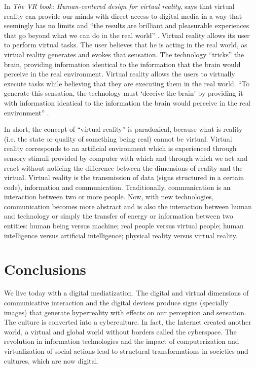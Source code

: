 \documentclass[english]{textolivre}
\begin{document}
In \textit{The VR book: Human-centered design for virtual reality}, \textcite{jerald_vr_2016} says that virtual reality can provide our minds with direct access to digital media in a way that seemingly has no limits and “the results are brilliant and pleasurable experiences that go beyond what we can do in the real world” \cite[p.~1]{jerald_vr_2016}. Virtual reality allows its user to perform virtual tasks. The user believes that he is acting in the real world, as virtual reality generates and evokes that sensation. The technology “tricks” the brain, providing information identical to the information that the brain would perceive in the real environment. Virtual reality allows the users to virtually execute tasks while believing that they are executing them in the real world. “To generate this sensation, the technology must ‘deceive the brain’ by providing it with information identical to the information the brain would perceive in the real environment” \cite[p.~xxii]{arnaldi_virtual_2018}.

In short, the concept of “virtual reality” is paradoxical, because what is reality (i.e. the state or quality of something being real) cannot be virtual. Virtual reality corresponds to an artificial environment which is experienced through sensory stimuli provided by computer with which and through which we act and react without noticing the difference between the dimensions of reality and the virtual. Virtual reality is the transmission of data (signs structured in a certain code), information and communication. Traditionally, communication is an interaction between two or more people. Now, with new technologies, communication becomes more abstract and is also the interaction between human and technology or simply the transfer of energy or information between two entities: human being versus machine; real people versus virtual people; human intelligence versus artificial intelligence; physical reality versus virtual reality.

\section{Conclusions}

We live today with a digital mediatization. The digital and virtual dimensions of communicative interaction and the digital devices produce signs (specially images) that generate hyperreality with effects on our perception and sensation. The culture is converted into a cyberculture. In fact, the Internet created another world, a virtual and global world without borders called the cyberspace. The revolution in information technologies and the impact of computerization and virtualization of social actions lead to structural transformations in societies and cultures, which are now digital.
\end{document}
